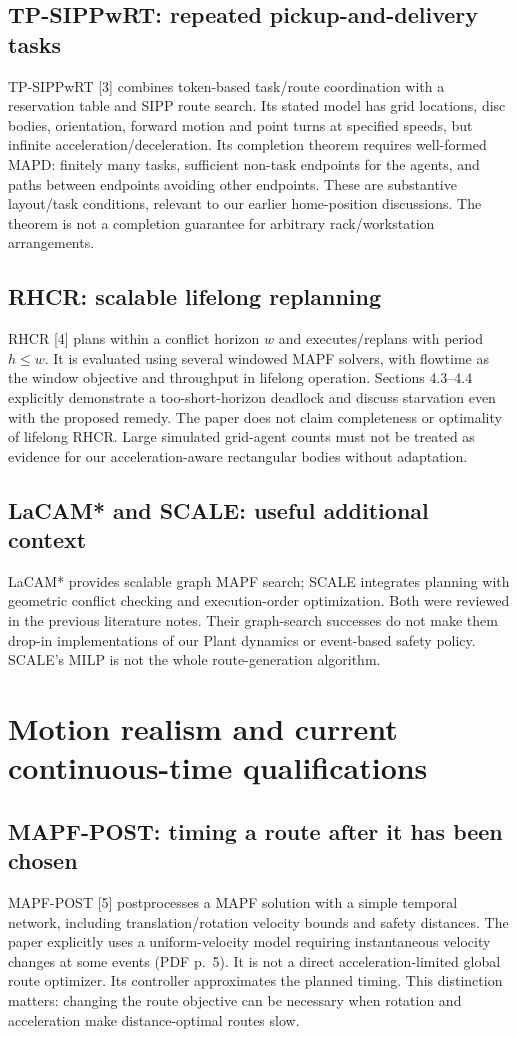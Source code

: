 \documentclass[11pt,a4paper]{article}
\begin{document}
\subsection*{TP-SIPPwRT: repeated pickup-and-delivery tasks}
TP-SIPPwRT [3] combines token-based task/route coordination with a reservation
table and SIPP route search. Its stated model has grid locations, disc bodies,
orientation, forward motion and point turns at specified speeds, but infinite
acceleration/deceleration. Its completion theorem requires well-formed MAPD:
finitely many tasks, sufficient non-task endpoints for the agents, and paths
between endpoints avoiding other endpoints. These are substantive layout/task
conditions, relevant to our earlier home-position discussions. The theorem is
not a completion guarantee for arbitrary rack/workstation arrangements.

\subsection*{RHCR: scalable lifelong replanning}
RHCR [4] plans within a conflict horizon $w$ and executes/replans with period
$h\le w$. It is evaluated using several windowed MAPF solvers, with flowtime
as the window objective and throughput in lifelong operation. Sections 4.3--4.4
explicitly demonstrate a too-short-horizon deadlock and discuss starvation even
with the proposed remedy. The paper does not claim completeness or optimality
of lifelong RHCR. Large simulated grid-agent counts must not be treated as
evidence for our acceleration-aware rectangular bodies without adaptation.

\subsection*{LaCAM* and SCALE: useful additional context}
LaCAM* provides scalable graph MAPF search; SCALE integrates planning with
geometric conflict checking and execution-order optimization. Both were reviewed
in the previous literature notes. Their graph-search successes do not make
them drop-in implementations of our Plant dynamics or event-based safety policy.
SCALE's MILP is not the whole route-generation algorithm.

\clearpage
\section{Motion realism and current continuous-time qualifications}
\subsection*{MAPF-POST: timing a route after it has been chosen}
MAPF-POST [5] postprocesses a MAPF solution with a simple temporal network,
including translation/rotation velocity bounds and safety distances. The paper
explicitly uses a uniform-velocity model requiring instantaneous velocity
changes at some events (PDF p.~5). It is not a direct acceleration-limited
global route optimizer. Its controller approximates the planned timing.
This distinction matters: changing the route objective can be necessary when
rotation and acceleration make distance-optimal routes slow.
\end{document}
